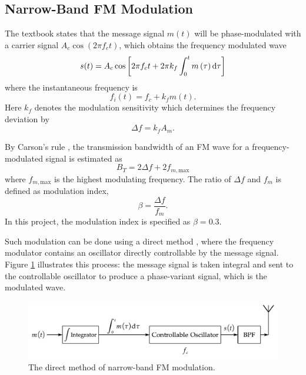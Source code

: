 \documentclass[../ECE459FinalProjectReport.tex]{subfiles}
\begin{document}
\subsection{Narrow-Band FM Modulation}
The textbook \cite[Sec. 4.1]{haykinIntroductionAnalogDigital2007} states that the message signal $m(t)$ will be phase-modulated with a carrier signal $A_c \cos\left(2\pi f_c t\right)$, which obtains the frequency modulated wave
\begin{equation}
    \label{eq:fm_modulated}
    s(t) = A_c \cos\left[ 2\pi f_c t + 2\pi k_f \int_0^{t} m\left(\tau\right) \mathrm{d}\tau \right]
\end{equation}
where the instantaneous frequency is
\begin{equation}
    f_i(t) = f_c + k_f m\left(t\right).
\end{equation}
Here $k_f$ denotes the modulation sensitivity which determines the frequency deviation by
\begin{equation}
    \Delta f = k_f A_m.
\end{equation}

By Carson's rule \cites[Sec. 4.6]{haykinIntroductionAnalogDigital2007}{CarsonRule2017}, the transmission bandwidth of an FM wave for a frequency-modulated signal is estimated as
\begin{equation}
    B_T = 2\Delta f + 2f_{m,\mathrm{max}}
\end{equation}
where $f_{m,\mathrm{max}}$ is the highest modulating frequency. The ratio of $\Delta f$ and $f_m$ is defined as modulation index,
\begin{equation}
    \beta = \frac{\Delta f}{f_m}.
\end{equation}
In this project, the modulation index is specified as $\beta=0.3$.

Such modulation can be done using a direct method \cite[Sec. 4.7]{haykinIntroductionAnalogDigital2007}, where the frequency modulator contains an oscillator directly controllable by the message signal. Figure \ref{fig:fm-mod} illustrates this process: the message signal is taken integral and sent to the controllable oscillator to produce a phase-variant signal, which is the modulated wave.
\begin{figure}[tb]
    \centering
    \includegraphics[scale=0.6]{plots/fm_mod.pdf}
    \caption{The direct method of narrow-band FM modulation.}
    \label{fig:fm-mod}
\end{figure}
\end{document}

